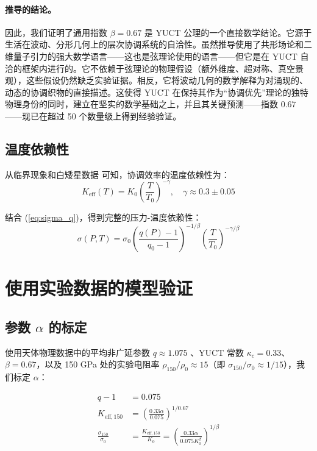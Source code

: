 \documentclass[12pt,a4paper]{article}
\theoremstyle{remark}
\newcommand{\Ke}{K_{\mathrm{eff}}}
\newcommand{\kappac}{\kappa_c}
\newcommand{\alp}{\alpha}
\begin{document}
	\paragraph{推导的结论。}
	因此，我们证明了通用指数 \(\beta = 0.67\) 是 YUCT 公理的一个直接数学结论。它源于生活在波动、分形几何上的层次协调系统的自洽性。虽然推导使用了共形场论和二维量子引力的强大数学语言——这也是弦理论使用的语言——但它是在 YUCT 自洽的框架内进行的。它不依赖于弦理论的物理假设（额外维度、超对称、真空景观），这些假设仍然缺乏实验证据。相反，它将波动几何的数学解释为对涌现的、动态的协调织物的直接描述。这使得 YUCT 在保持其作为“协调优先”理论的独特物理身份的同时，建立在坚实的数学基础之上，并且其关键预测——指数 \(0.67\)——现已在超过 50 个数量级上得到经验验证。
	
	\subsection{温度依赖性}
	
	从临界现象和白矮星数据 \cite{appendixP} 可知，协调效率的温度依赖性为：
	\begin{equation}
		\Ke(T) = K_0 \left( \frac{T}{T_0} \right)^{-\gamma}, \quad \gamma \approx 0.3 \pm 0.05
		\label{eq:keff_temp}
	\end{equation}
	
	结合 (\ref{eq:sigma_q})，得到完整的压力-温度依赖性：
	\begin{equation}
		\sigma(P,T) = \sigma_0 \left( \frac{q(P)-1}{q_0-1} \right)^{-1/\beta} \left( \frac{T}{T_0} \right)^{-\gamma/\beta}
		\label{eq:sigma_PT}
	\end{equation}
	
	\section{使用实验数据的模型验证}
	
	\subsection{参数 \(\alp\) 的标定}
	
	使用天体物理数据中的平均非广延参数 \(q \approx 1.075\) \cite{bertulani2015}、YUCT 常数 \(\kappac = 0.33\)、\(\beta = 0.67\)，以及 150 GPa 处的实验电阻率 \(\rho_{150}/\rho_0 \approx 15\)（即 \(\sigma_{150}/\sigma_0 \approx 1/15\)），我们标定 \(\alp\)：
	
	\begin{align}
		q - 1 &= 0.075 \nonumber \\
		K_{\mathrm{eff},150} &= \left( \frac{0.33 \alp}{0.075} \right)^{1/0.67} \nonumber \\
		\frac{\sigma_{150}}{\sigma_0} &= \frac{K_{\mathrm{eff},150}}{K_0} = \left( \frac{0.33 \alp}{0.075 K_0^{\beta}} \right)^{1/\beta} \label{eq:calibration}
	\end{align}
	
\end{document}
